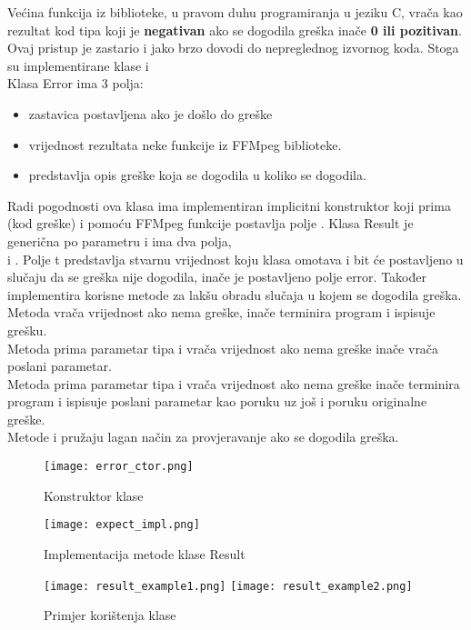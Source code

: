  \label{sec:result}
Većina funkcija iz biblioteke, u pravom duhu programiranja u jeziku C, vrača kao rezultat kod tipa  koji
je \textbf{negativan} ako se dogodila greška inače \textbf{0 ili pozitivan}. 
\\
Ovaj pristup je zastario i jako brzo dovodi do nepreglednog izvornog koda. Stoga su implementirane klase
 i  
\\
\paraBreak
Klasa Error ima 3 polja: 
\begin{itemize}
  \item {} zastavica postavljena ako je došlo do greške
  \item {} vrijednost rezultata neke funkcije iz FFMpeg biblioteke.
  \item {} predstavlja opis greške koja se dogodila u koliko se dogodila.
\end{itemize}
Radi pogodnosti ova klasa ima implementiran implicitni konstruktor koji prima  (kod greške) i pomoću
FFMpeg funkcije  postavlja polje .
\paraBreak
Klasa Result je generična po parametru  i ima dva polja, 
\\ 
 i . 
\paraBreak
Polje t predstavlja stvarnu vrijednost koju klasa omotava i bit će postavljeno u slučaju da se greška nije dogodila,
inače je postavljeno polje error.
\paraBreak
Također implementira korisne metode za lakšu obradu slučaja u kojem se dogodila greška. 
\\
Metoda  vrača vrijednost  ako nema greške, inače terminira program i ispisuje grešku. 
\\
Metoda  prima parametar tipa  i vrača vrijednost  ako nema greške inače vrača
poslani parametar. 
\\
Metoda  prima parametar tipa  i vrača vrijednost  ako nema greške
inače terminira program i ispisuje poslani parametar kao poruku uz još i poruku originalne greške. 
\\
Metode  i   pružaju lagan način za provjeravanje ako se dogodila greška.

\begin{figure}[h]
  \texttt{[image: error\_ctor.png]}
  \caption[Konstruktor klase Error]{Konstruktor klase }
\end{figure}
\begin{figure}[h]
  \texttt{[image: expect\_impl.png]}
  \caption[Klasa Result implementacija]{Implementacija metode  klase Result}
\end{figure}
\begin{figure}[h]
  \texttt{[image: result\_example1.png]}
  \texttt{[image: result\_example2.png]}
  \caption[Primjer korištenja klase Result]{Primjer korištenja klase }
\end{figure}


